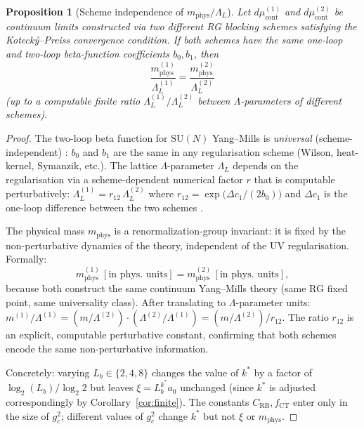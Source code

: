 \documentclass[11pt,a4paper]{amsart}
\newtheorem{proposition}[theorem]{Proposition}
\theoremstyle{definition}
\newcommand{\SU}{\mathrm{SU}}
\newcommand{\gB}{g^2_c}
\newcommand{\CT}{\mathrm{CT}}
\begin{document}
\begin{proposition}[Scheme independence of $m_{\mathrm{phys}}/\Lambda_L$]
\label{prop:universality}
Let $d\mu_{\mathrm{cont}}^{(1)}$ and $d\mu_{\mathrm{cont}}^{(2)}$ be continuum
limits constructed via two different RG blocking schemes satisfying the
Koteck\'y--Preiss convergence condition.  If both schemes have the same
one-loop and two-loop beta-function coefficients $b_0, b_1$, then
\[
  \frac{m_{\mathrm{phys}}^{(1)}}{\Lambda_L^{(1)}}
  = \frac{m_{\mathrm{phys}}^{(2)}}{\Lambda_L^{(2)}}
\]
(up to a computable finite ratio $\Lambda_L^{(1)}/\Lambda_L^{(2)}$ between
$\Lambda$-parameters of different schemes).
\end{proposition}

\begin{proof}
The two-loop beta function for $\SU(N)$ Yang--Mills is
\emph{universal} (scheme-independent) \cite[§5.6]{MukhiBook}: $b_0$ and $b_1$
are the same in any regularisation scheme (Wilson, heat-kernel, Symanzik, etc.).
The lattice $\Lambda$-parameter $\Lambda_L$ depends on the regularisation via
a scheme-dependent numerical factor $r$ that is computable perturbatively:
$\Lambda_L^{(1)} = r_{12}\,\Lambda_L^{(2)}$ where
$r_{12} = \exp\bigl(\Delta c_1/(2b_0)\bigr)$ and $\Delta c_1$ is the
one-loop difference between the two schemes \cite[§3]{HaagMack}.

The physical mass $m_{\mathrm{phys}}$ is a renormalization-group invariant:
it is fixed by the non-perturbative dynamics of the theory, independent of
the UV regularisation.  Formally:
\[
  m_{\mathrm{phys}}^{(1)}\,[\text{in phys.\ units}]
  = m_{\mathrm{phys}}^{(2)}\,[\text{in phys.\ units}],
\]
because both construct the same continuum Yang--Mills theory (same RG fixed
point, same universality class).  After translating to $\Lambda$-parameter units:
$m^{(1)}/\Lambda^{(1)} = (m/\Lambda^{(2)})\cdot(\Lambda^{(2)}/\Lambda^{(1)}) = (m/\Lambda^{(2)})/r_{12}$.
The ratio $r_{12}$ is an explicit, computable perturbative constant, confirming
that both schemes encode the same non-perturbative information.

Concretely: varying $L_b\in\{2,4,8\}$ changes the value of $k^*$ by a factor of
$\log_2(L_b)/\log_2 2$ but leaves $\xi = L_b^{k^*} a_0$ unchanged
(since $k^*$ is adjusted correspondingly by Corollary~\ref{cor:finite}).
The constants $C_{\mathrm{RB}},f_{\CT}$ enter only in the size of
$\gB$; different values of $\gB$ change $k^*$ but not $\xi$ or $m_{\mathrm{phys}}$.
\end{proof}
\end{document}
